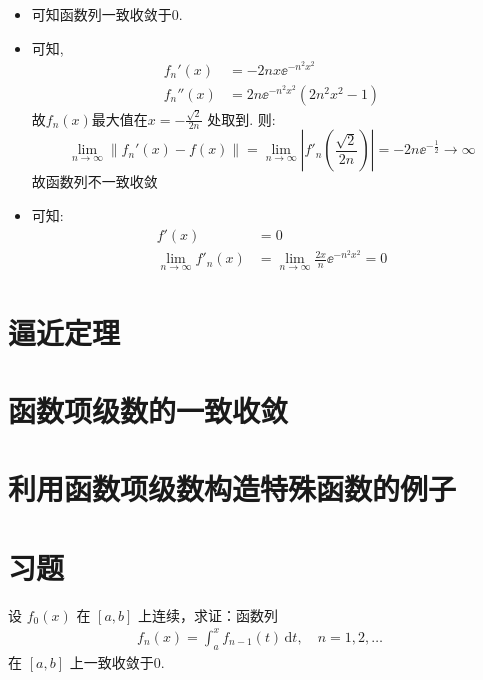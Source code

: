 \begin{solution}
    \begin{itemize}
        \item 可知函数列一致收敛于\(0\).
        \item 可知,
            \begin{align*}
                f_{n}'(x)  & = -2nx\ee^{-n^{2}x^{2}}     \\
                f_{n}''(x) & = 2n\ee^{-n^{2}x^{2}}\left(
                2n^{2}x^{2} - 1\right)
            \end{align*}
            故\(f_{n}(x)\)最大值在\(x = -\frac{\sqrt{2}}{2n}\) 处取到.
            则: \[
                \lim_{n \to \infty} \left\lVert f_{n}'(x) - f(x)
                \right\rVert = \lim_{n \to \infty} \left|
                f'_{n}\left(\frac{\sqrt{2}}{2n}\right) \right| =
                -2n\ee^{-\frac{1}{2}} \to \infty
            \]
            故函数列不一致收敛
        \item 可知:
            \begin{align*}
                f'(x)                         & = 0
                \\
                \lim_{n \to \infty} f'_{n}(x) & = \lim_{n \to \infty}
                \frac{2x}{n}\ee^{-n^{2}x^{2}} = 0
            \end{align*}
    \end{itemize}
\end{solution}
\section{逼近定理}
\section{函数项级数的一致收敛}
\section{利用函数项级数构造特殊函数的例子}
\section{习题}

\begin{problem}
    设 \(f_0(x)\) 在 \([a, b]\) 上连续，求证：函数列
    \begin{align*}
        f_n(x) = \int_a^x f_{n-1}(t) \, \mathrm{d}t, \quad
        n = 1, 2, \dots
    \end{align*}
    在 \([a, b]\) 上一致收敛于0.
\end{problem}


